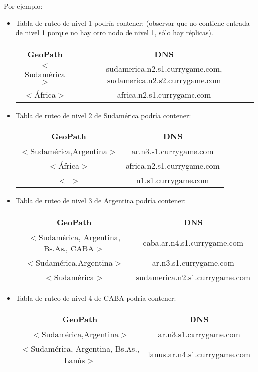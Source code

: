 Por ejemplo:
\begin{itemize}
	\item Tabla de ruteo de nivel 1 podría contener: (observar que no contiene entrada de nivel 1 porque no hay otro nodo de nivel 1, sólo hay réplicas).
	
	\begin{center}
	\begin{tabular}{| c | c |}
	\hline
	GeoPath & DNS \\
	\hline
	$<$Sudamérica$>$ & sudamerica.n2.s1.currygame.com, sudamerica.n2.s2.currygame.com\\
	\hline
	$<$África$>$ & africa.n2.s1.currygame.com\\
	\hline
	\end{tabular}
	\end{center}
	
	\item Tabla de ruteo de nivel 2 de Sudamérica podría contener:

	\begin{center}
	\begin{tabular}{| c | c |}
	\hline
	GeoPath & DNS \\
	\hline
	$<$Sudamérica,Argentina$>$ &  ar.n3.s1.currygame.com\\
	\hline
	$<$África$>$ & africa.n2.s1.currygame.com\\
	\hline
    $<$ $>$ &  n1.s1.currygame.com\\
	\hline
	\end{tabular}
	\end{center}
	
	\item Tabla de ruteo de nivel 3 de Argentina podría contener:
	\begin{center}
	\begin{tabular}{| c | c |}
	\hline
	GeoPath & DNS \\
	\hline
	$<$Sudamérica, Argentina, Bs.As., CABA$>$ & caba.ar.n4.s1.currygame.com\\
	\hline
	$<$Sudamérica,Argentina$>$ &  ar.n3.s1.currygame.com\\
	\hline
	$<$Sudamérica$>$ &  sudamerica.n2.s1.currygame.com\\
	\hline
	\end{tabular}
	\end{center}
	
	\item Tabla de ruteo de nivel 4 de CABA podría contener:
	\begin{center}
	\begin{tabular}{| c | c |}
	\hline
	GeoPath & DNS \\
	\hline
	$<$Sudamérica,Argentina$>$ &  ar.n3.s1.currygame.com\\
	\hline
	$<$Sudamérica, Argentina, Bs.As., Lanús$>$ & lanus.ar.n4.s1.currygame.com\\
	\hline
	\end{tabular}
	\end{center}

\end{itemize}



